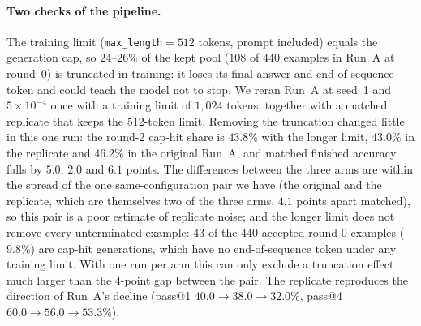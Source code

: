 \documentclass[runningheads]{llncs}
\begin{document}
\paragraph{Two checks of the pipeline.}
The training limit (\texttt{max\_length}$=512$ tokens, prompt included) equals the
generation cap, so $24$--$26\%$ of the kept pool ($108$ of $440$ examples in Run~A
at round~0) is truncated in training: it loses its final answer and
end-of-sequence token and could teach the model not to stop. We reran Run~A at
seed~1 and $5\times10^{-4}$ once with a training limit of $1{,}024$ tokens,
together with a matched replicate that keeps the $512$-token limit. Removing the
truncation changed little in this one run: the round-2 cap-hit share is
$43.8\%$ with the longer limit, $43.0\%$ in the replicate and $46.2\%$ in the
original Run~A, and matched finished accuracy falls by $5.0$, $2.0$ and $6.1$
points. The differences between the three arms are within the spread of the
one same-configuration pair we have (the original and the replicate, which are
themselves two of the three arms, $4.1$ points apart matched), so this pair is
a poor estimate of replicate noise; and the longer limit does not remove
every unterminated example: $43$ of the $440$ accepted round-0 examples
($9.8\%$) are cap-hit generations, which have no end-of-sequence token under
any training limit. With one run per arm this can only exclude a truncation
effect much larger than the $4$-point gap between the pair. The replicate reproduces the
direction of Run~A's decline (pass@1 $40.0\to38.0\to32.0\%$, pass@4
$60.0\to56.0\to53.3\%$).
\end{document}
